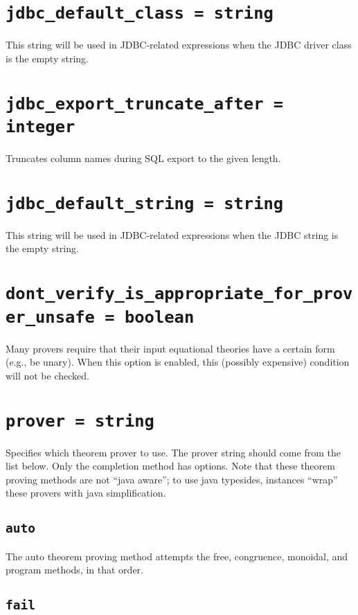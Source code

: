\documentclass[10pt]{book}
\begin{document}
\section{ {\tt jdbc\_default\_class = string } }
This string will be used in JDBC-related expressions when the JDBC driver class is the empty string.

\section{ {\tt jdbc\_export\_truncate\_after = integer } }
Truncates column names during SQL export to the given length.

\section{ {\tt jdbc\_default\_string = string } }

This string will be used in JDBC-related expressions when the JDBC string is the empty string.

\section{{\tt dont\_verify\_is\_appropriate\_for\_prover\_unsafe = boolean}}
Many provers require that their input equational theories have a certain form (e.g., be unary).  When this option is enabled, this (possibly expensive) condition will not be checked.
				
\section{{\tt prover = string}}
Specifies which theorem prover to use.  The prover string should come from the list below.  Only the completion method has options.  Note that these theorem proving methods are not ``java aware''; to use java typesides, instances ``wrap'' these provers with java simplification.

\subsection{{\tt auto}}

The auto theorem proving method attempts the free, congruence, monoidal, and program methods, in that order.

 \subsection{{\tt fail}}
 
\end{document}
